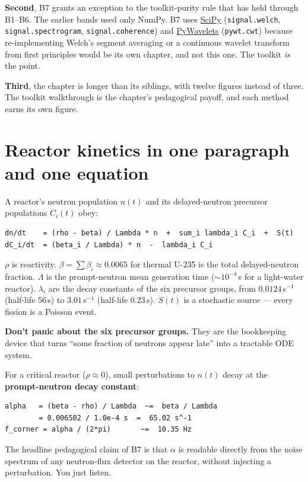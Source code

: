 \documentclass[11pt,a4paper,openany]{book}
\begin{document}
\textbf{Second}, B7 grants an exception to the toolkit-purity rule that has
held through B1--B6. The earlier bands used only NumPy. B7 uses
\href{https://scipy.org}{SciPy} (\texttt{signal.welch}, \texttt{signal.spectrogram},
\texttt{signal.coherence}) and \href{https://pywavelets.readthedocs.io}{PyWavelets}
(\texttt{pywt.cwt}) because re-implementing Welch's segment averaging or a
continuous wavelet transform from first principles would be its own chapter,
and not this one. The toolkit \emph{is} the point.

\textbf{Third}, the chapter is longer than its siblings, with twelve figures
instead of three. The toolkit walkthrough is the chapter's pedagogical payoff,
and each method earns its own figure.

\section{Reactor kinetics in one paragraph and one equation}

A reactor's neutron population $n(t)$ and its delayed-neutron precursor
populations $C_i(t)$ obey:
\begin{lstlisting}[style=shaddata]
dn/dt    = (rho - beta) / Lambda * n  +  sum_i lambda_i C_i  +  S(t)
dC_i/dt  = (beta_i / Lambda) * n  -  lambda_i C_i
\end{lstlisting}

$\rho$ is reactivity. $\beta = \sum \beta_i \approx 0.0065$ for thermal U-235
is the total delayed-neutron fraction. $\Lambda$ is the prompt-neutron mean
generation time ($\sim 10^{-4}$\,s for a light-water reactor). $\lambda_i$ are
the decay constants of the six precursor groups, from $0.0124$\,s$^{-1}$ (half-life
56\,s) to $3.01$\,s$^{-1}$ (half-life 0.23\,s). $S(t)$ is a stochastic
source --- every fission is a Poisson event.

\textbf{Don't panic about the six precursor groups.} They are the bookkeeping
device that turns ``some fraction of neutrons appear late'' into a tractable
ODE system.

For a critical reactor ($\rho \approx 0$), small perturbations to $n(t)$ decay
at the \textbf{prompt-neutron decay constant}:
\begin{lstlisting}[style=shaddata]
alpha   = (beta - rho) / Lambda  ~=  beta / Lambda
        = 0.006502 / 1.0e-4 s  =  65.02 s^-1
f_corner = alpha / (2*pi)       ~=  10.35 Hz
\end{lstlisting}

The headline pedagogical claim of B7 is that $\alpha$ is readable directly from
the noise spectrum of any neutron-flux detector on the reactor, without
injecting a perturbation. You just listen.
\end{document}

